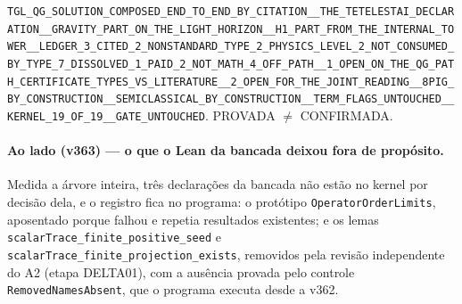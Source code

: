 \documentclass[11pt]{article}
\theoremstyle{definition}\newtheorem{deriv}{Derivação}
\begin{document}
\texttt{TGL\_QG\_SOLUTION\_COMPOSED\_END\_TO\_END\_BY\_CITATION\_\_THE\_TETELESTAI\_DECLARATION\_\_GRAVITY\_PART\_ON\_THE\_LIGHT\_HORIZON\_\_H1\_PART\_FROM\_THE\_INTERNAL\_TOWER\_\_LEDGER\_3\_CITED\_2\_NONSTANDARD\_TYPE\_2\_PHYSICS\_LEVEL\_2\_NOT\_CONSUMED\_BY\_TYPE\_7\_DISSOLVED\_1\_PAID\_2\_NOT\_MATH\_4\_OFF\_PATH\_\_1\_OPEN\_ON\_THE\_QG\_PATH\_CERTIFICATE\_TYPES\_VS\_LITERATURE\_\_2\_OPEN\_FOR\_THE\_JOINT\_READING\_\_8PIG\_BY\_CONSTRUCTION\_\_SEMICLASSICAL\_BY\_CONSTRUCTION\_\_TERM\_FLAGS\_UNTOUCHED\_\_KERNEL\_19\_OF\_19\_\_GATE\_UNTOUCHED}. PROVADA $\neq$ CONFIRMADA.

\paragraph*{Ao lado (v363) --- o que o Lean da bancada deixou fora de propósito.} Medida a árvore inteira, três declarações da bancada não estão no kernel por decisão dela, e o registro fica no programa: o protótipo \texttt{OperatorOrderLimits}, aposentado porque falhou e repetia resultados existentes; e os lemas \texttt{scalarTrace\_finite\_positive\_seed} e \texttt{scalarTrace\_finite\_projection\_exists}, removidos pela revisão independente do A2 (etapa DELTA01), com a ausência provada pelo controle \texttt{RemovedNamesAbsent}, que o programa executa desde a v362.
\end{document}
